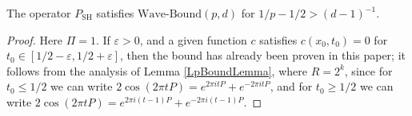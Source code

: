 \begin{lemma}
    The operator $P_{\text{SH}}$ satisfies $\text{Wave-Bound}(p,d)$ for $1/p - 1/2 > (d-1)^{-1}$.
\end{lemma}
\begin{proof}
    Here $\Pi = 1$. If $\varepsilon > 0$, and a given function $c$ satisfies $c(x_0,t_0) = 0$ for $t_0 \in [1/2 - \varepsilon, 1/2 + \varepsilon]$, then the bound has already been proven in this paper; it follows from the analysis of Lemma \ref{LpBoundLemma}, where $R = 2^k$, since for $t_0 \leq 1/2$ we can write $2 \cos(2 \pi t P) = e^{2 \pi i t P} + e^{-2 \pi i t P}$, and for $t_0 \geq 1/2$ we can write $2 \cos(2 \pi t P) = e^{2 \pi i (t - 1) P} + e^{-2 \pi i (t - 1) P}$.
\end{proof}
% 